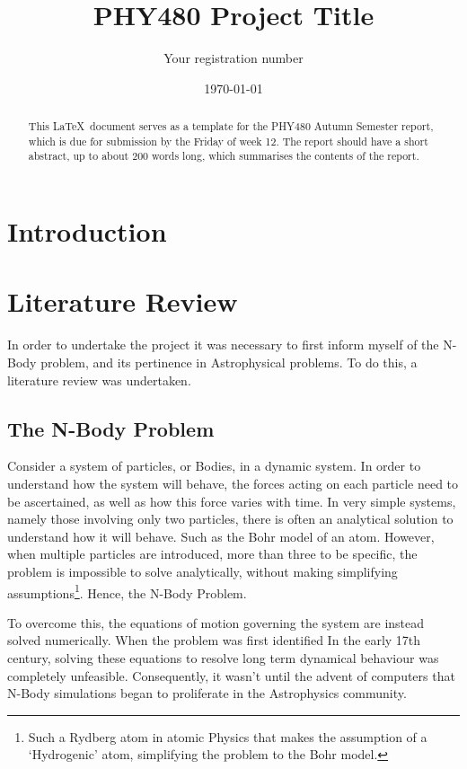 \documentclass[a4paper,10pt]{article}
\title{PHY480 Project Title}
\author{Your registration number}
\date{\today}
\begin{document}
\maketitle

\begin{abstract}
This \LaTeX\ document serves as a template for the PHY480 Autumn Semester report, which is due for submission by the Friday of week 12. The report should have a short abstract, up to about 200 words long, which summarises the contents of the report.
\end{abstract}

\section{Introduction}
\label{sec:introduction}




\section{Literature Review}

In order to undertake the project it was necessary to first inform myself of the N-Body problem, and its pertinence in Astrophysical problems. To do this, a literature review was undertaken.

\subsection{The N-Body Problem}

Consider a system of particles, or Bodies, in a dynamic system. In order to understand how the system will behave, the forces acting on each particle need to be ascertained, as well as how this force varies with time. In very simple systems, namely those involving only two particles, there is often an analytical solution to understand how it will behave. Such as the Bohr model of an atom. However, when multiple particles are introduced, more than three to be specific, the problem is impossible to solve analytically, without making simplifying assumptions\footnote{Such a Rydberg atom in atomic Physics that makes the assumption of a `Hydrogenic' atom, simplifying the problem to the Bohr model.}. Hence, the N-Body Problem.  

To overcome this, the equations of motion governing the system are instead solved numerically. When the problem was first identified In the early 17th century, solving these equations to resolve long term dynamical behaviour was completely unfeasible. Consequently, it wasn't until the advent of computers that N-Body simulations began to proliferate in the Astrophysics community.
\end{document}
